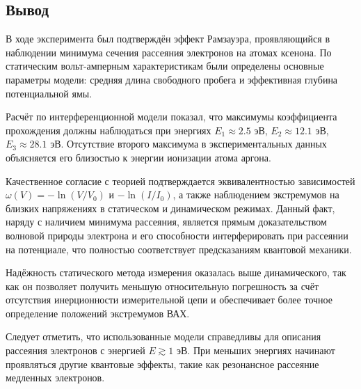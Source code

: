 \documentclass[a4paper,12pt]{article} %
\begin{document}
\newpage

\begin{center}
\section*{Вывод}
\end{center}

В ходе эксперимента был подтверждён эффект Рамзауэра, проявляющийся в наблюдении минимума сечения рассеяния электронов на атомах ксенона. По статическим вольт-амперным характеристикам были определены основные параметры модели: средняя длина свободного пробега и эффективная глубина потенциальной ямы.

Расчёт по интерференционной модели показал, что максимумы коэффициента прохождения должны наблюдаться при энергиях $E_1 \approx 2.5$ эВ, $E_2 \approx 12.1$ эВ, $E_3 \approx 28.1$ эВ. Отсутствие второго максимума в экспериментальных данных объясняется его близостью к энергии ионизации атома аргона.

Качественное согласие с теорией подтверждается эквивалентностью зависимостей $\omega(V) = -\ln(V/V_0)$ и $-\ln(I/I_0)$, а также наблюдением экстремумов на близких напряжениях в статическом и динамическом режимах. Данный факт, наряду с наличием минимума рассеяния, является прямым доказательством волновой природы электрона и его способности интерферировать при рассеянии на потенциале, что полностью соответствует предсказаниям квантовой механики.

Надёжность статического метода измерения оказалась выше динамического, так как он позволяет получить меньшую относительную погрешность за счёт отсутствия инерционности измерительной цепи и обеспечивает более точное определение положений экстремумов ВАХ.

Следует отметить, что использованные модели справедливы для описания рассеяния электронов с энергией $E \gtrsim 1$ эВ. При меньших энергиях начинают проявляться другие квантовые эффекты, такие как резонансное рассеяние медленных электронов.
        
				
\end{document}
